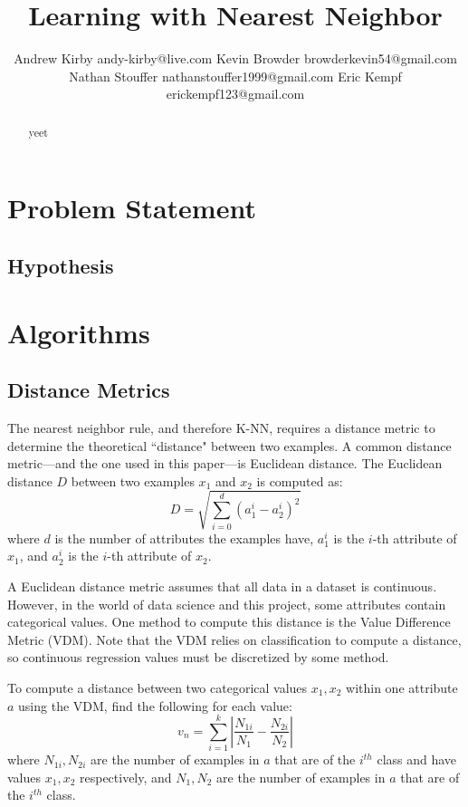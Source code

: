 \documentclass[twoside,11pt]{article}
\begin{document}
\title{Learning with Nearest Neighbor}

\author{\name Andrew Kirby \email andy-kirby@live.com \AND
		\name Kevin Browder \email browderkevin54@gmail.com \AND
		\name Nathan Stouffer \email nathanstouffer1999@gmail.com \AND
		\name Eric Kempf \email erickempf123@gmail.com }

\maketitle

\begin{abstract}
yeet
\end{abstract}

\section{Problem Statement}

\subsection*{Hypothesis}

\section{Algorithms}

\subsection{Distance Metrics}

The nearest neighbor rule, and therefore K-NN, requires a distance metric to determine the theoretical ``distance" between two examples. A common distance metric---and the one used in this paper---is Euclidean distance. The Euclidean distance $D$ between two examples $x_1$ and $x_2$ is computed as:
$$D = \sqrt{\sum_{i=0}^{d}(a_1^i - a_2^i)^2}$$
where $d$ is the number of attributes the examples have, $a_1^i$ is the $i$-th attribute of $x_1$, and $a_2^i$ is the $i$-th attribute of $x_2$.

A Euclidean distance metric assumes that all data in a dataset is continuous. However, in the world of data science and this project, some attributes contain categorical values. One method to compute this distance is the Value Difference Metric (VDM). Note that the VDM relies on classification to compute a distance, so continuous regression values must be discretized by some method.

To compute a distance between two categorical values $x_1, x_2$ within one attribute $a$ using the VDM, find the following for each value:
$$ v_n = \sum _{i = 1}^{k} | \dfrac{N_{1i}}{N_1} - \dfrac{N_{2i}}{N_2} | $$
where $N_{1i}, N_{2i}$ are the number of examples in $a$ that are of the $i^{th}$ class and have values $x_1, x_2$ respectively, and $N_1, N_2$ are the number of examples in $a$ that are of the $i^{th}$ class.
\end{document}
